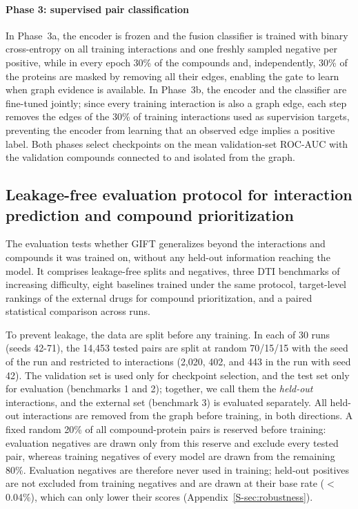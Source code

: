 \documentclass[10pt,letterpaper]{article}
\begin{document}
\paragraph{Phase 3: supervised pair classification}
In Phase~3a, the encoder is frozen and the fusion classifier is trained with binary cross-entropy on all training interactions and one freshly sampled negative per positive, while in every epoch 30\% of the compounds and, independently, 30\% of the proteins are masked by removing all their edges, enabling the gate to learn when graph evidence is available. In Phase~3b, the encoder and the classifier are fine-tuned jointly; since every training interaction is also a graph edge, each step removes the edges of the 30\% of training interactions used as supervision targets, preventing the encoder from learning that an observed edge implies a positive label. Both phases select checkpoints on the mean validation-set ROC-AUC with the validation compounds connected to and isolated from the graph.

\subsection{Leakage-free evaluation protocol for interaction prediction and compound prioritization}
\label{sec:evaluation}
The evaluation tests whether GIFT generalizes beyond the interactions and compounds it was trained on, without any held-out information reaching the model. It comprises leakage-free splits and negatives, three DTI benchmarks of increasing difficulty, eight baselines trained under the same protocol, target-level rankings of the external drugs for compound prioritization, and a paired statistical comparison across runs.

To prevent leakage, the data are split before any training. In each of 30 runs (seeds 42-71), the 14,453 tested pairs are split at random 70/15/15 with the seed of the run and restricted to interactions (2,020, 402, and 443 in the run with seed 42). The validation set is used only for checkpoint selection, and the test set only for evaluation (benchmarks 1 and 2); together, we call them the \emph{held-out} interactions, and the external set (benchmark 3) is evaluated separately. All held-out interactions are removed from the graph before training, in both directions. A fixed random 20\% of all compound-protein pairs is reserved before training: evaluation negatives are drawn only from this reserve and exclude every tested pair, whereas training negatives of every model are drawn from the remaining 80\%. Evaluation negatives are therefore never used in training; held-out positives are not excluded from training negatives and are drawn at their base rate ($<$0.04\%), which can only lower their scores (Appendix~\ref{S-sec:robustness}).
\end{document}
